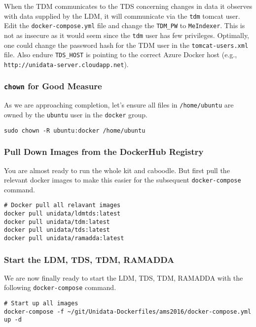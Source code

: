 \documentclass[onecolumn,9pt]{article}
\begin{document}
When the TDM communicates to the TDS concerning changes in data it observes with data supplied by the LDM, it will communicate via the \texttt{tdm} tomcat user. Edit the \texttt{docker-compose.yml} file and change the \texttt{TDM\_PW} to \texttt{MeIndexer}. This is not as insecure as it would seem since the \texttt{tdm} user has few privileges. Optimally, one could change the password hash for the TDM user in the \texttt{tomcat-users.xml} file. Also endure \texttt{TDS\_HOST} is pointing to the correct Azure Docker host (e.g., \texttt{http://unidata-server.cloudapp.net}).



\subsubsection{\texttt{chown} for Good Measure}
\label{sec:orgheadline39}

As we are approaching completion, let's ensure all files in \texttt{/home/ubuntu} are owned by the \texttt{ubuntu} user in the \texttt{docker} group.

\begin{verbatim}
sudo chown -R ubuntu:docker /home/ubuntu
\end{verbatim}

\subsubsection{Pull Down Images from the DockerHub Registry}
\label{sec:orgheadline40}

You are almost ready to run the whole kit and caboodle. But first  pull the relevant docker images to make this easier for the subsequent \texttt{docker-compose} command.

\begin{verbatim}
# Docker pull all relavant images
docker pull unidata/ldmtds:latest
docker pull unidata/tdm:latest
docker pull unidata/tds:latest
docker pull unidata/ramadda:latest
\end{verbatim}

\subsubsection{Start the LDM, TDS, TDM, RAMADDA}
\label{sec:orgheadline41}

We are now finally ready to start the LDM, TDS, TDM, RAMADDA with the following \texttt{docker-compose} command.

\begin{verbatim}
# Start up all images
docker-compose -f ~/git/Unidata-Dockerfiles/ams2016/docker-compose.yml up -d
\end{verbatim}
\end{document}
